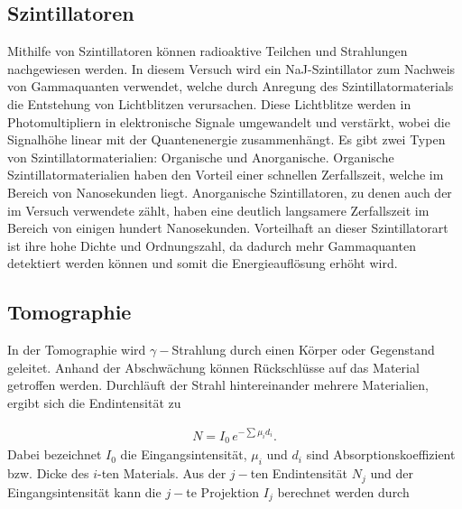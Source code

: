         \subsection{Szintillatoren}

            Mithilfe von Szintillatoren können radioaktive Teilchen und Strahlungen nachgewiesen werden.
            In diesem Versuch wird ein NaJ-Szintillator zum Nachweis von Gammaquanten verwendet, 
            welche durch Anregung des Szintillatormaterials die Entstehung von Lichtblitzen verursachen.
            Diese Lichtblitze werden in Photomultipliern in elektronische Signale umgewandelt
            und verstärkt, wobei die Signalhöhe linear mit der Quantenenergie zusammenhängt. 
            Es gibt zwei Typen von Szintillatormaterialien: Organische und Anorganische.
            Organische Szintillatormaterialien haben den Vorteil einer schnellen Zerfallszeit, welche im 
            Bereich von Nanosekunden liegt. Anorganische Szintillatoren, zu denen auch der im Versuch 
            verwendete zählt, haben eine deutlich langsamere Zerfallszeit im Bereich von einigen 
            hundert Nanosekunden. Vorteilhaft an dieser Szintillatorart ist ihre hohe Dichte und 
            Ordnungszahl, da dadurch mehr Gammaquanten detektiert werden können und somit die 
            Energieauflösung erhöht wird.


        \subsection{Tomographie}

            In der Tomographie wird $\gamma-$Strahlung durch einen Körper oder Gegenstand geleitet.
            Anhand der Abschwächung können Rückschlüsse auf das Material getroffen werden. 
            Durchläuft der Strahl hintereinander mehrere Materialien, ergibt sich die Endintensität zu

            \begin{align*}
                N = I_0 \,e^{-\sum\mu_id_i}.
            \end{align*}
            Dabei bezeichnet $I_0$ die Eingangsintensität, $\mu_i$ und $d_i$ sind Absorptionskoeffizient
            bzw. Dicke des $i$-ten Materials. Aus der $j-$ten Endintensität $N_j$ und der Eingangsintensität 
            kann die $j-$te Projektion $I_j$ berechnet werden durch

